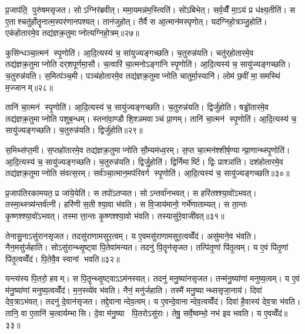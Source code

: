 प्र॒जाप॑ति॒ पुरु॑षमसृजत। सोऽग्निर॑ब्रवीत्। ममा॒यमन्न॑म॒स्त्विति॑। सो॑ऽबिभेत्। सर्व॒व्वैँ मा॒ऽयं प्र ध॑क्ष्य॒तीति॑। स ए॒ताश्चतु॑र्\mbox{}होतॄनात्म॒स्पर॑णानपश्यत्। तान॑जुहोत्। तैर्वै स आ॒त्मान॑मस्पृणोत्। यद॑ग्निहो॒त्रञ्जु॒होति॑। एक॑होतारमे॒व तद्य॑ज्ञक्र॒तुमाप्नोत्यग्निहो॒त्रम्॥२७॥

कुसि॑न्धञ्चा॒त्मन॑ स्पृ॒णोति॑। आ॒दि॒त्यस्य॑ च॒ सा॑युज्यङ्गच्छति। च॒तुरुन्न॑यति। चतु॑र्‌होतारमे॒व तद्य॑ज्ञक्र॒तुमाप्नोति दर्‌शपूर्णमा॒सौ। च॒त्वारि॑ चा॒त्मनोऽङ्गा॑नि स्पृ॒णोति॑। आ॒दि॒त्यस्य॑ च॒ सायु॑ज्यङ्गच्छति। च॒तुरुन्न॑यति। स॒मित्प॑ञ्च॒मी। पञ्च॑होतारमे॒व तद्य॑ज्ञक्र॒तुमाप्नोति चातुर्मा॒स्यानि॑। लोम॑ छ॒वीं मा॒समस्थि॑ म॒ज्जानम्॥२८॥

तानि॑ चा॒त्मन॑ स्पृ॒णोति॑। आ॒दि॒त्यस्य॑ च॒ सायु॑ज्यङ्गच्छति। च॒तुरुन्न॑यति। द्विर्जु॑होति। षड्ढो॑तारमे॒व तद्य॑ज्ञक्र॒तुमाप्नोति पशुब॒न्धम्। स्तना॑वा॒ण्डौ शि॒श्ञमवाञ्चं प्रा॒णम्। तानि॑ चा॒त्मन॑ स्पृ॒णोति॑। आ॒दि॒त्यस्य॑ च॒ सायु॑ज्यङ्गच्छति। च॒तुरुन्न॑यति। द्विर्जु॑होति॥२९॥

स॒मिथ्स॑प्त॒मी। स॒प्तहो॑तारमे॒व तद्य॑ज्ञक्र॒तुमाप्नोति सौ॒म्यम॑ध्व॒रम्। स॒प्त चा॒त्मन॑श्शीर्\mbox{}ष॒ण्यान्प्रा॒णान्थ्स्पृ॒णोति॑। आ॒दि॒त्यस्य॑ च॒ सायु॑ज्यङ्गच्छति। च॒तुरुन्न॑यति। द्विर्जु॒होति॑। द्विर्निमार्ष्टि। द्विः प्राश्ञा॑ति। दश॑होतारमे॒व तद्य॑ज्ञक्र॒तुमाप्नोति संवत्स॒रम्। सर्व॑ञ्चा॒त्मान॒मप॑रिवर्ग स्पृ॒णोति॑। आ॒दि॒त्यस्य॑ च॒ सायु॑ज्यङ्गच्छति॥३०॥\anuvakamend[अ॒ग्नि॒हो॒त्रं म॒ज्जान॒न्द्विर्जु॑हो॒त्यप॑रिवर्ग स्पृ॒णोत्येक॑ञ्च]

प्र॒जाप॑तिरकामयत॒ प्र जा॑ये॒येति॑। स तपो॑ऽतप्यत। सोऽन्तर्वा॑नभवत्। स हरि॑तश्श्या॒वो॑ऽभवत्। तस्मा॒थ्स्त्र्य॑न्तर्व॑त्नी। हरि॑णी स॒ती श्या॒वा भ॑वति। स वि॒जाय॑मानो॒ गर्भे॑णाताम्यत्। स ता॒न्तः कृ॒ष्णश्श्या॒वो॑ऽभवत्। तस्मात्ता॒न्तः कृ॒ष्णश्श्या॒वो भ॑वति। तस्यासु॑रे॒वाजी॑वत्॥३१॥

तेनासु॒नाऽसु॑रानसृजत। तदसु॑राणामसुर॒त्वम्। य ए॒वमसु॑राणामसुर॒त्वव्वेँद॑। असु॑माने॒व भ॑वति। नैन॒मसु॑र्जहाति। सोऽसु॑रान्थ्सृ॒ष्ट्वा पि॒तेवा॑मन्यत। तदनु॑ पि॒तॄन॑सृजत। तत्पि॑तृ॒णां पि॑तृ॒त्वम्। य ए॒वं पि॑तृ॒णां पि॑तृ॒त्वव्वेँद॑। पि॒तेवै॒व स्वानां भवति॥३२॥

यन्त्य॑स्य पि॒तरो॒ हवम्। स पि॒तॄन्थ्सृ॒ष्ट्वाऽऽम॑नस्यत्। तदनु॑ मनु॒ष्या॑नसृजत। तन्म॑नु॒ष्या॑णां मनुष्य॒त्वम्। य ए॒वं म॑नु॒ष्या॑णां मनुष्य॒त्वव्वेँद॑। म॒न॒स्व्ये॑व भ॑वति। नैनं॒ मनु॑र्जहाति। तस्मै॑ मनु॒ष्यान्थ्ससृजा॒नाय॑। दिवा॑ देव॒त्राऽभ॑वत्। तदनु॑ दे॒वान॑सृजत। तद्दे॒वानान्देव॒त्वम्। य ए॒वन्दे॒वानान्देव॒त्वव्वेँद॑। दिवा॑ है॒वास्य॑ देव॒त्रा भ॑वति। तानि॒ वा ए॒तानि॑ च॒त्वार्यम्भासि। दे॒वा म॑नु॒ष्या पि॒तरोऽसु॑राः। तेषु॒ सर्वे॒ष्वम्भो॒ नभ॑ इव भवति। य ए॒वव्वेँद॑॥३३॥\anuvakamend[अ॒जी॒व॒थ्स्वानां भवति दे॒वान॑सृजत स॒प्त च॑]

